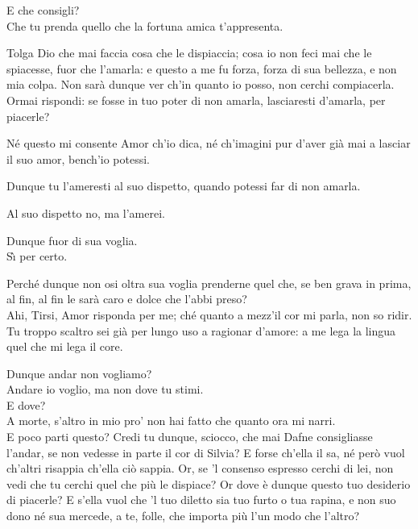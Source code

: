 \documentclass{book}
\begin{document}
	\4 E che consigli? \\

   \5 Che tu prenda quello
	che la fortuna amica t'appresenta.

	\4 Tolga Dio che mai faccia
	cosa che le dispiaccia;
	cosa io non feci mai che le spiacesse,
	fuor che l'amarla: e questo a me fu forza,
	forza di sua bellezza, e non mia colpa.
	Non sar\`a dunque ver ch'in quanto io posso,
	non cerchi compiacerla. \\

   \5 Ormai rispondi:
	se fosse in tuo poter di non amarla,
	lasciaresti d'amarla, per piacerle?

	\4 N\'e questo mi consente Amor ch'io dica,
	n\'e ch'imagini pur d'aver gi\`a mai
	a lasciar il suo amor, bench'io potessi.

	\5 Dunque tu l'ameresti al suo dispetto,
	quando potessi far di non amarla.

	\4 Al suo dispetto no, ma l'amerei.

	\5 Dunque fuor di sua voglia. \\

   \4 S\`{\i} per certo.

	\5 Perch\'e dunque non osi oltra sua voglia
	prenderne quel che, se ben grava in prima,
	al fin, al fin le sar\`a caro e dolce
	che l'abbi preso? \\

   \4 Ahi, Tirsi, Amor risponda
	per me; ch\'e quanto a mezz'il cor mi parla,
	non so ridir. Tu troppo scaltro sei
	gi\`a per lungo uso a ragionar d'amore:
	a me lega la lingua
	quel che mi lega il core.

	\5 Dunque andar non vogliamo? \\

   \4 Andare io voglio,
	ma non dove tu stimi. \\

   \5 E dove? \\

   \4 A morte,
	s'altro in mio pro' non hai fatto che quanto
	ora mi narri. \\

   \5 E poco parti questo?
	Credi tu dunque, sciocco, che mai Dafne
	consigliasse l'andar, se non vedesse
	in parte il cor di Silvia? E forse ch'ella
	il sa, n\'e per\`o vuol ch'altri risappia
	ch'ella ci\`o sappia. Or, se 'l consenso espresso
	cerchi di lei, non vedi che tu cerchi
	quel che pi\`u le dispiace? Or dove \`e dunque
	questo tuo desiderio di piacerle?
	E s'ella vuol che 'l tuo diletto sia
	tuo furto o tua rapina, e non suo dono
	n\'e sua mercede, a te, folle, che importa
	pi\`u l'un modo che l'altro? \\
\end{document}
